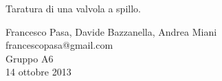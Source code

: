 \begin{center}

	\vspace{0.5cm}
     	{\huge Taratura di una valvola a spillo.}
	\vspace{0.5cm}

      	{\large Francesco Pasa, Davide Bazzanella, Andrea Miani} \\
      	{francescopasa@gmail.com} \\
		{\large Gruppo A6} \\
	
	\vspace{0.3cm}
      	{\large 14 ottobre 2013}
    
    \vspace{0.7cm}

\end{center}
